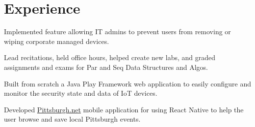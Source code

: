 \documentclass[]{openfont}
\begin{document}
\begin{minipage}[t]{0.60\textwidth} 


\section{Experience}

\vspace{\topsep} %
\begin{tightemize}
    \item Implemented feature allowing IT admins to prevent users from removing
        or wiping corporate managed devices.
\end{tightemize}

\vspace{\topsep} %
\begin{tightemize}
    \item Lead recitations, held office hours, helped create new labs, and graded
        assignments and exams for Par and Seq Data Structures and Algos.
\end{tightemize}

\vspace{\topsep} %
\begin{tightemize}
    \item Built from scratch a Java Play Framework web application to easily configure and monitor the security state and data of IoT devices.
\end{tightemize}

\vspace{\topsep} %
\begin{tightemize}
    \item Developed \href{http://www.pittsburgh.net/}{Pittsburgh.net} mobile application for using React Native to help the user browse and save local Pittsburgh events.
\end{tightemize}


\end{minipage}
\end{document}
